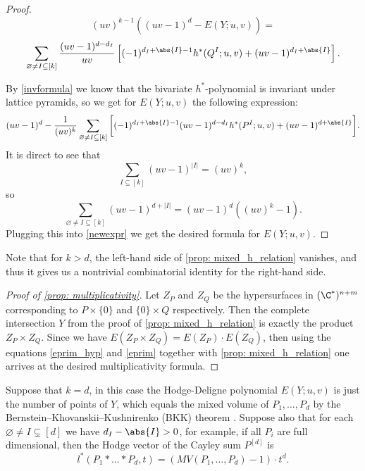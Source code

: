\documentclass[reqno, 11pt, a4paper, oneside]{amsart}
\begin{document}
\begin{proof}
\[ (uv)^{k-1} \left( \left( u v -1 \right)^{d} - E(Y; u,v) \right) =\] 
\[\sum_{\varnothing\not=I \subseteq [k]} \frac{(uv-1)^{d-d_I}}{uv} \left[(-1)^{d_I+\abs{I}-1} h^*(Q^I;u,v)+(uv-1)^{d_I+\abs{I}}\right].\]

By \eqref{invformula} we know that the bivariate $h^*$-polynomial is invariant under lattice pyramids, so we get for $E (Y; u,v)$ the following expression:
\begin{equation}(uv-1)^d-\frac{1}{(uv)^k} \sum_{\varnothing\not=I \subseteq [k]}  \bigg[ (-1)^{d_I+\abs{I}-1}(uv-1)^{d-d_I} h^*(P^I;u,v)+ (uv-1)^{d+\abs{I}} \bigg].\label{newexpr}\end{equation}
It is direct to see that
\[\sum_{I \subseteq [k]} (uv-1)^{|I|} = (uv)^k,\]
so 
\[\sum_{\varnothing\not=I \subseteq [k]} (uv-1)^{d+|I|} = (uv-1)^d((uv)^k-1).\]
Plugging this into \eqref{newexpr} we get the desired formula for $E(Y;u,v)$.
\end{proof}


Note that for $k>d$, the left-hand side of \cref{prop: mixed_h_relation} vanishes, and thus it gives us a nontrivial combinatorial identity for the right-hand side.  

\begin{proof}[Proof of \cref{prop: multiplicativity}]
Let $Z_P$ and $Z_Q$ be the hypersurfaces in $(\C^*)^{n+m}$ corresponding to $P\times \{0\}$ and $\{0\} \times Q$ respectively. Then the complete intersection $Y$ from the proof of \cref{prop: mixed_h_relation} is exactly the product $Z_P \times Z_Q$. Since we have $E(Z_P \times Z_Q)=E(Z_P) \cdot E(Z_Q)$, then using the equations \eqref{eprim_hyp} and \eqref{eprim} together with \cref{prop: mixed_h_relation} one arrives at the desired multiplicativity formula. 
\end{proof}


\begin{ex} \label{prop:relation_to_MV}
Suppose that $k=d$, in this case the Hodge-Deligne polynomial $E(Y;u,v)$ is just the number of points of $Y$, which equals  the mixed volume of $P_1,\ldots, P_d$ by the Bernstein–Khovanskii–Kushnirenko (BKK) theorem \cite{bernstein_number_1975,kouchnirenko_polyedres_1976}. Suppose also that  for each $\varnothing \neq I \subsetneq [d]$ we have $d_I - \abs{I} >0$, for example, if all $P_i$ are full dimensional, then the Hodge vector of the Cayley sum $P^{[d]}$ is 
\[ l^*(P_1 * \ldots *  P_d, t) = \left(MV(P_1,\ldots,P_d)-1\right)\cdot t^{d}.  \]
\label{easy-cayley}
\end{ex}
 
\end{document}
